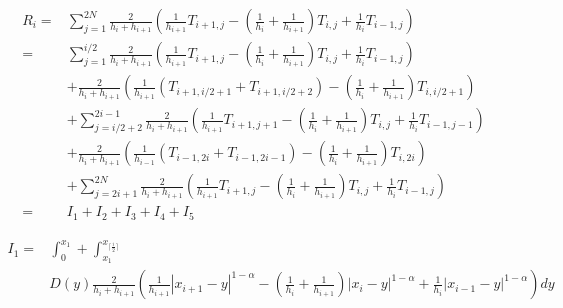 \documentclass{ctexart}
\begin{document}
\begin{equation}
    \begin{aligned}
        R_i 
        =& \sum_{j=1}^{2N} \frac{2}{h_i + h_{i+1}} 
        \left( \frac{1}{h_{i+1}} T_{i+1, j} 
        - (\frac{1}{h_{i}}+\frac{1}{h_{i+1}}) T_{i,j}
        +  \frac{1}{h_{i}} T_{i-1, j} \right)   \\
        = & \sum_{j=1}^{i/2} \frac{2}{h_i + h_{i+1}} 
        \left( \frac{1}{h_{i+1}} T_{i+1, j} 
        - (\frac{1}{h_{i}}+\frac{1}{h_{i+1}}) T_{i,j}
        +  \frac{1}{h_{i}} T_{i-1, j} \right)   \\
          & + \frac{2}{h_i + h_{i+1}} 
          \left( \frac{1}{h_{i+1}} (T_{i+1, i/2+1} +  T_{i+1, i/2+2})
          - (\frac{1}{h_{i}}+\frac{1}{h_{i+1}}) T_{i,i/2+1} \right)   \\
          & + \sum_{j=i/2+2}^{2i-1} \frac{2}{h_i + h_{i+1}} 
          \left( \frac{1}{h_{i+1}} T_{i+1, j+1} 
          - (\frac{1}{h_{i}}+\frac{1}{h_{i+1}}) T_{i,j}
          +  \frac{1}{h_{i}} T_{i-1, j-1} \right)   \\
          & + \frac{2}{h_i + h_{i+1}} 
          \left( \frac{1}{h_{i-1}} (T_{i-1, 2i} +  T_{i-1, 2i-1})
          - (\frac{1}{h_{i}}+\frac{1}{h_{i+1}}) T_{i,2i} \right)   \\
          & + \sum_{j=2i+1}^{2N} \frac{2}{h_i + h_{i+1}} 
        \left( \frac{1}{h_{i+1}} T_{i+1, j} 
        - (\frac{1}{h_{i}}+\frac{1}{h_{i+1}}) T_{i,j}
        +  \frac{1}{h_{i}} T_{i-1, j} \right)   \\
        = & I_1 + I_2 + I_3 + I_4 + I_5
    \end{aligned}
\end{equation}


\begin{equation}
    \begin{aligned}
        I_1 =& \int_0^{x_1} +\int_{x_1}^{x_{\lceil \frac{i}{2}\rceil}}               \\ 
        & D(y) \frac{2}{h_i + h_{i+1}} 
        ( \frac{1}{h_{i+1}} |x_{i+1}-y|^{1-\alpha} 
        - (\frac{1}{h_{i}}+\frac{1}{h_{i+1}}) |x_{i}-y|^{1-\alpha}
        +  \frac{1}{h_{i}}|x_{i-1}-y|^{1-\alpha} )  dy 
    \end{aligned}
\end{equation}
\end{document}
